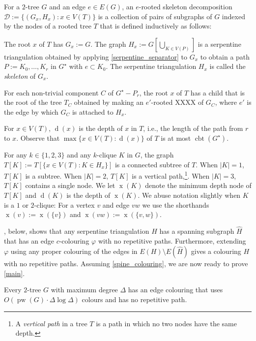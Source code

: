 \documentclass[kpfonts]{patmorin}
\DeclareMathOperator{\pw}{pw}
\DeclareMathOperator{\x}{x}
\DeclareMathOperator{\depth}{d}
\DeclareMathOperator{\cbt}{cbt}
\begin{document}
For a $2$-tree $G$ and an edge $e\in E(G)$, an $e$-rooted skeleton decomposition $\mathcal{D}:=\{(G_x,H_x):x\in V(T)\}$ is a collection of pairs of subgraphs of $G$ indexed by the nodes of a rooted tree $T$ that is defined inductively as follows:
\begin{compactenum}
    \item The root $x$ of $T$ has $G_x:=G$.  The graph $H_x:=G[\bigcup_{K\in V(P)}]$ is a serpentine triangulation obtained by applying \cref{serpentine_separator} to $G_x$ to obtain a path $P:=K_0,\ldots,K_r$ in $G^\star$ with $e\subset K_0$.  The serpentine triangulation $H_x$ is called the \emph{skeleton} of $G_x$.
    \item For each non-trivial component $C$ of $G^\star-P_r$, the root $x$ of $T$ has a child that is the root of the tree $T_C$ obtained by making an $e'$-rooted XXXX of $G_C$, where $e'$ is the edge by which $G_C$ is attached to $H_x$.
\end{compactenum}
For $x\in V(T)$, $\depth(x)$ is the depth of $x$ in $T$, i.e., the length of the path from $r$ to $x$. Observe that $\max\{x\in V(T):\depth(x)\}$ of $T$ is at most $\cbt(G^\star)$.

For any $k\in\{1,2,3\}$ and any $k$-clique $K$ in $G$, the graph $T[K]:=T[\{x\in V(T):K\in H_x\}]$ is a connected subtree of $T$.  When $|K|=1$, $T[K]$ is a subtree.  When $|K|=2$, $T[K]$ is a vertical path,\footnote{A \emph{vertical path} in a tree $T$ is a path in which no two nodes have the same depth.}.  When $|K|=3$, $T[K]$ contains a single node.  We let $\x(K)$ denote the minimum depth node of $T[K]$ and $\depth(K)$ is the depth of $\x(K)$. We abuse notation slightly when $K$ is a $1$ or $2$-clique:  For a vertex $v$ and edge $vw$ we use the shorthands $\x(v):=\x(\{v\})$ and $\x(vw):=\x(\{v,w\})$.

, below, shows that any serpentine triangulation $H$ has a spanning subgraph $\hat{H}$ that has an edge $c$-colouring $\varphi$ with no repetitive paths.  Furthermore, extending $\varphi$ using any proper colouring of the edges in $E(H)\setminus E(\hat{H})$ gives a colouring $H$ with no repetitive paths. Assuming \cref{spine_colouring}, we are now ready to prove \cref{main}.

\begin{thm}\label{main}
    Every $2$-tree $G$ with maximum degree $\Delta$ has an edge colouring that uses $O(\pw(G)\cdot\Delta\log\Delta)$ colours and has no repetitive path.
\end{thm}
\end{document}
